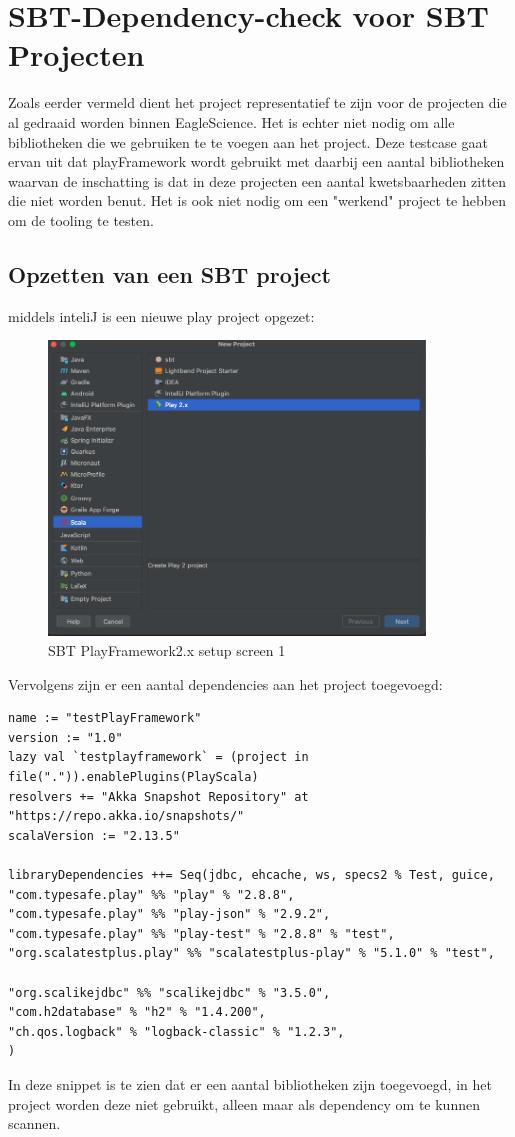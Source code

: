 \section{SBT-Dependency-check voor SBT Projecten}\label{sec:sbt-dependency-check-voor-sbt-projecten}
Zoals eerder vermeld dient het project representatief te zijn voor de projecten die al gedraaid worden binnen EagleScience. Het is echter niet nodig om alle bibliotheken die we gebruiken te te voegen aan het project. Deze testcase gaat ervan uit dat playFramework wordt gebruikt met daarbij een aantal bibliotheken waarvan de inschatting is dat in deze projecten een aantal kwetsbaarheden zitten die niet worden benut. Het is ook niet nodig om een "werkend" project te hebben om de tooling te testen.

\subsection{Opzetten van een SBT project}\label{subsec:opzetten-van-een-project}
middels inteliJ is een nieuwe play project opgezet:
\begin{figure}[H]
    \centering
    \includegraphics[width=10cm]{gfx/sbtplaysetup}
    \caption{SBT PlayFramework2.x setup screen 1}
    \label{fig:sbtplaysetupscreen1}
\end{figure}
Vervolgens zijn er een aantal dependencies aan het project toegevoegd:
\begin{lstlisting}[caption={build.sbt},label=lst:build.sbt]
name := "testPlayFramework"
version := "1.0"
lazy val `testplayframework` = (project in file(".")).enablePlugins(PlayScala)
resolvers += "Akka Snapshot Repository" at "https://repo.akka.io/snapshots/"
scalaVersion := "2.13.5"

libraryDependencies ++= Seq(jdbc, ehcache, ws, specs2 % Test, guice,
"com.typesafe.play" %% "play" % "2.8.8",
"com.typesafe.play" %% "play-json" % "2.9.2",
"com.typesafe.play" %% "play-test" % "2.8.8" % "test",
"org.scalatestplus.play" %% "scalatestplus-play" % "5.1.0" % "test",

"org.scalikejdbc" %% "scalikejdbc" % "3.5.0",
"com.h2database" % "h2" % "1.4.200",
"ch.qos.logback" % "logback-classic" % "1.2.3",
)

\end{lstlisting}
In deze snippet is te zien dat er een aantal bibliotheken zijn toegevoegd, in het project worden deze niet gebruikt, alleen maar als dependency om te kunnen scannen.


